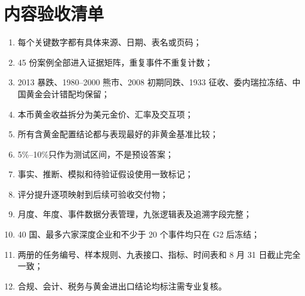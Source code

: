 \documentclass[UTF8,12pt,openany]{ctexbook}
\begin{document}
\chapter{内容验收清单}
\begin{enumerate}[label=\ensuremath{\square}]
  \item 每个关键数字都有具体来源、日期、表名或页码；
  \item 45 份案例全部进入证据矩阵，重复事件不重复计数；
  \item 2013 暴跌、1980--2000 熊市、2008 初期同跌、1933 征收、委内瑞拉冻结、中国黄金会计错配均保留；
  \item 本币黄金收益拆分为美元金价、汇率及交互项；
  \item 所有含黄金配置结论都与表现最好的非黄金基准比较；
  \item 5\%--10\%只作为测试区间，不是预设答案；
  \item 事实、推断、模拟和待验证假设使用一致标记；
  \item 评分提升逐项映射到后续可验收交付物；
  \item 月度、年度、事件数据分表管理，九张逻辑表及追溯字段完整；
  \item 40 国、最多六家深度企业和不少于 20 个事件均只在 G2 后冻结；
  \item 两册的任务编号、样本规则、九表接口、指标、时间表和 8 月 31 日截止完全一致；
  \item 合规、会计、税务与黄金进出口结论均标注需专业复核。
\end{enumerate}

\backmatter
\printbibliography[title={参考文献与权威来源}]
\end{document}
